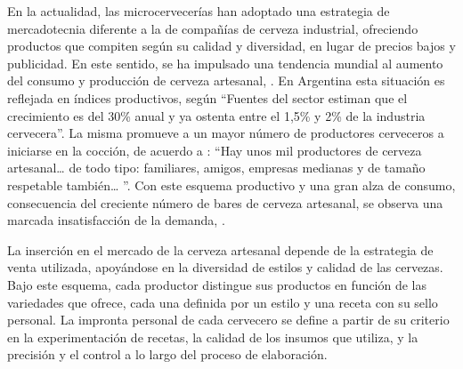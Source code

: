     \par
    En la actualidad, las microcervecerías han adoptado una estrategia de mercadotecnia diferente a la de compañías de cerveza industrial, ofreciendo productos que compiten según su calidad y diversidad, en lugar de precios bajos y publicidad. En este sentido, se ha  impulsado una tendencia mundial al aumento del consumo y producción de cerveza artesanal, \cite{Calvillo17}. En Argentina esta situación es reflejada en índices productivos, según \cite{Cuculiansky17} “Fuentes del sector estiman que el crecimiento es del 30\% anual y ya ostenta entre el 1,5\% y 2\% de la industria cervecera”. La misma promueve a un mayor número de productores cerveceros a iniciarse en la cocción, de acuerdo a \cite{Aizen17}: “Hay unos mil productores de cerveza artesanal… de todo tipo: familiares, amigos, empresas medianas y de tamaño respetable también… ”. Con este esquema productivo y una gran alza de consumo, consecuencia del creciente número de bares de cerveza artesanal, se observa una marcada insatisfacción de la demanda, \cite{Rios16}.
    \par
    La inserción en el mercado de la cerveza artesanal depende de la estrategia de venta utilizada, apoyándose en la diversidad de estilos y calidad de las cervezas. Bajo este esquema, cada productor distingue sus productos en función de las variedades que ofrece, cada una definida por un estilo y una receta con su sello personal. La impronta personal de cada cervecero se define a partir de su criterio en la experimentación de recetas, la calidad de los insumos que utiliza, y la precisión y el control a lo largo del proceso de elaboración.
    
